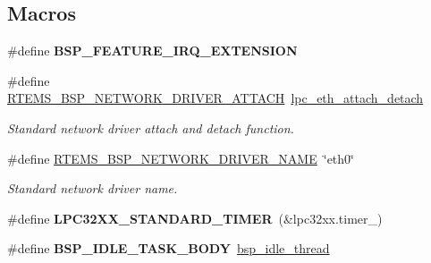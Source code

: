 \subsection*{Macros}
\begin{DoxyCompactItemize}
\item 
\mbox{\label{group__RTEMSBSPsARMLPC32XX_ga5d7d631d3a14b7554160f14eb42f351b}} 
\#define {\bfseries B\+S\+P\+\_\+\+F\+E\+A\+T\+U\+R\+E\+\_\+\+I\+R\+Q\+\_\+\+E\+X\+T\+E\+N\+S\+I\+ON}
\item 
\mbox{\label{group__RTEMSBSPsARMLPC32XX_gadde0d66aef9442971dde465292ac14e6}} 
\#define \mbox{\hyperlink{group__RTEMSBSPsARMLPC32XX_gadde0d66aef9442971dde465292ac14e6}{R\+T\+E\+M\+S\+\_\+\+B\+S\+P\+\_\+\+N\+E\+T\+W\+O\+R\+K\+\_\+\+D\+R\+I\+V\+E\+R\+\_\+\+A\+T\+T\+A\+CH}}~\mbox{\hyperlink{group__RTEMSBSPsARMLPC24XX_ga1ee87990424a1bed28cb5081a56043b2}{lpc\+\_\+eth\+\_\+attach\+\_\+detach}}
\begin{DoxyCompactList}\small\item\em Standard network driver attach and detach function. \end{DoxyCompactList}\item 
\mbox{\label{group__RTEMSBSPsARMLPC32XX_ga86d4f9aa98431100692e31068070a8df}} 
\#define \mbox{\hyperlink{group__RTEMSBSPsARMLPC32XX_ga86d4f9aa98431100692e31068070a8df}{R\+T\+E\+M\+S\+\_\+\+B\+S\+P\+\_\+\+N\+E\+T\+W\+O\+R\+K\+\_\+\+D\+R\+I\+V\+E\+R\+\_\+\+N\+A\+ME}}~\char`\"{}eth0\char`\"{}
\begin{DoxyCompactList}\small\item\em Standard network driver name. \end{DoxyCompactList}\item 
\mbox{\label{group__RTEMSBSPsARMLPC32XX_gafb67622e5cceeb245a3b9ceedac09bce}} 
\#define {\bfseries L\+P\+C32\+X\+X\+\_\+\+S\+T\+A\+N\+D\+A\+R\+D\+\_\+\+T\+I\+M\+ER}~(\&lpc32xx.\+timer\+\_)
\item 
\mbox{\label{group__RTEMSBSPsARMLPC32XX_ga4aa606d0badadcc28e8054cb60f13b56}} 
\#define {\bfseries B\+S\+P\+\_\+\+I\+D\+L\+E\+\_\+\+T\+A\+S\+K\+\_\+\+B\+O\+DY}~\mbox{\hyperlink{group__RTEMSBSPsSPARCLEON3_ga301be7085b80c41a9c5887247003c662}{bsp\+\_\+idle\+\_\+thread}}

\end{DoxyCompactItemize}
